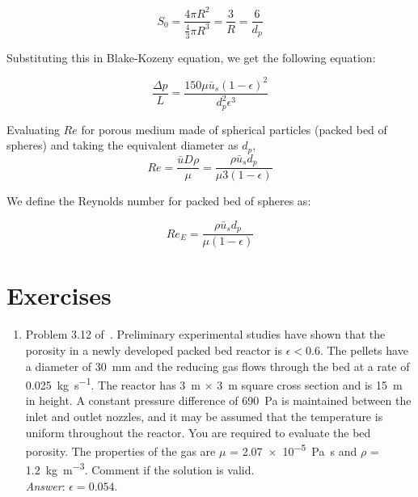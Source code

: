 $$ S_0  = \frac{4 \pi R^2}{\frac{4}{3}\pi R^3} = \frac{3}{R} = \frac{6}{d_p} $$

Substituting this in Blake-Kozeny equation, we get the following equation:

\begin{equation}
\label{ergunp1}
\boxed{
  \frac{\Delta p}{L} = \frac{150 \mu \bar{u}_s \left(1-\epsilon\right)^2}{d_p^2 \epsilon^3}
}
\end{equation}


Evaluating $Re$ for porous medium made of spherical particles (packed bed of spheres) and taking the equivalent diameter as $d_p$,
$$Re = \frac{\bar{u}D\rho}{\mu} = \frac{\rho \bar{u}_s d_p}{\mu 3 (1-\epsilon)} $$

We define the Reynolds number for packed bed of spheres as:

\begin{equation}
\boxed{
   Re_E = \frac{\rho \bar{u}_s d_p}{\mu (1-\epsilon)}
}
\label{rec}
\end{equation}

\section{Exercises}

\begin{enumerate}
 \item Problem 3.12 of~\cite{gp}. Preliminary experimental studies have shown that the porosity in a newly developed packed bed reactor is $\epsilon < 0.6$. The pellets have a diameter of \SI{30}{\milli\metre} and the reducing gas flows through the bed at a rate of \SI{0.025}{\kilo\gram\per\second}. The reactor has \SI{3}{\metre} $\times$ \SI{3}{\metre} square cross section and is \SI{15}{\metre} in height. A constant pressure difference of \SI{690}{\pascal} is maintained between the inlet and outlet nozzles, and it may be assumed that the temperature is uniform throughout the reactor. You are required to evaluate the bed porosity. The properties of the gas are $\mu$ = \SI{2.07e-5}{\pascal\second} and $\rho$ = \SI{1.2}{\kilo\gram\per\metre\cubed}. Comment if the solution is valid. \\
{\it Answer}: $\epsilon = 0.054$.

\end{enumerate}




